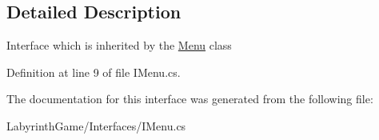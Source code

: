 \subsection{Detailed Description}
Interface which is inherited by the \hyperlink{class_labyrinth_game_1_1_menu}{Menu} class 



Definition at line 9 of file I\+Menu.\+cs.



The documentation for this interface was generated from the following file\+:\begin{DoxyCompactItemize}
\item 
Labyrinth\+Game/\+Interfaces/I\+Menu.\+cs\end{DoxyCompactItemize}
